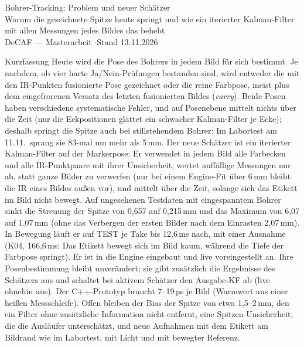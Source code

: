 \documentclass[11pt,a4paper,fleqn]{article}
\begin{document}
\begin{center}
  {\LARGE Bohrer-Tracking: Problem und neuer Schätzer}\\[2mm]
  {\large Warum die gezeichnete Spitze heute springt und wie ein iterierter Kalman-Filter\\[0.5mm]
  mit allen Messungen jedes Bildes das behebt}\\[2mm]
  {\small DeCAF --- Masterarbeit \quad$\cdot$\quad Stand 13.11.2026}
\end{center}

\begin{mybox}{Kurzfassung}
Heute wird die Pose des Bohrers in jedem Bild für sich bestimmt. Je nachdem, ob vier harte Ja/Nein-Prüfungen
bestanden sind, wird entweder die mit den IR-Punkten fusionierte Pose gezeichnet oder die reine Farbpose, meist
plus dem eingefrorenen Versatz des letzten fusionierten Bildes (\emph{carry}). Beide Posen haben verschiedene
systematische Fehler, und auf Posenebene mittelt nichts über die Zeit (nur die Eckpositionen glättet ein
schwacher Kalman-Filter je Ecke); deshalb springt die Spitze auch bei stillstehendem Bohrer: Im Labortest am
11.11.\ sprang sie 83-mal um mehr als 5\,mm. Der neue Schätzer ist ein iterierter Kalman-Filter auf der
Markerpose: Er verwendet in jedem Bild alle Farbecken und alle IR-Punktpaare mit ihrer Unsicherheit, wertet
auffällige Messungen nur ab, statt ganze Bilder zu verwerfen (nur bei einem Engine-Fit über 6\,mm bleibt die IR
eines Bildes außen vor), und mittelt über die Zeit, solange sich das Etikett im Bild nicht bewegt. Auf
ungesehenen Testdaten mit eingespanntem Bohrer sinkt die Streuung der Spitze von 0,657 auf 0,215\,mm und das
Maximum von 6,07 auf 1,07\,mm (ohne das Verbergen der ersten Bilder nach dem Einrasten 2,07\,mm). In
Bewegung läuft er auf TEST je Take bis 12,6\,ms nach, mit einer Ausnahme (K04, 166,6\,ms: Das Etikett bewegt sich im
Bild kaum, während die Tiefe der Farbpose springt). Er ist in die Engine eingebaut und live voreingestellt an.
Ihre Posenbestimmung bleibt unverändert; sie gibt zusätzlich die Ergebnisse des Schätzers aus und schaltet bei aktivem Schätzer
den Ausgabe-KF ab (live ohnehin aus). Der C++-Prototyp braucht 7--19\,µs je Bild (Warmwert aus einer heißen
Messschleife). Offen
bleiben der Bias der Spitze von etwa 1,5--2\,mm, den ein Filter ohne zusätzliche Information nicht entfernt,
eine Spitzen-Unsicherheit, die die Ausläufer unterschätzt, und neue Aufnahmen mit dem Etikett am Bildrand wie im
Labortest, mit Licht und mit bewegter Referenz.
\end{mybox}
\end{document}
